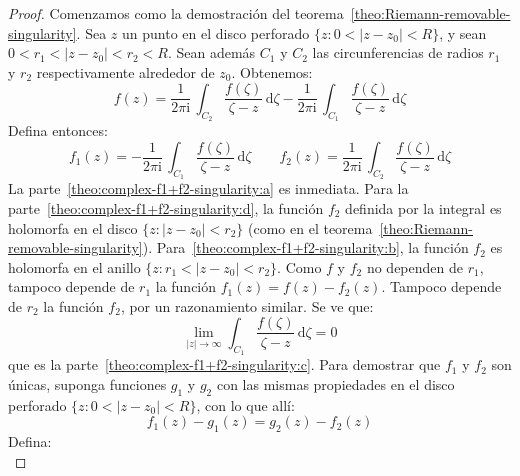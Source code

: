   \begin{proof}
    Comenzamos como la demostración
    del teorema~\ref{theo:Riemann-removable-singularity}.
    Sea \(z\) un punto en el disco perforado
    \(\{ z \colon 0 < \lvert z - z_0 \rvert < R \}\),
    y sean \(0 < r_1 < \lvert z - z_0 \rvert < r_2 < R\).
    Sean además \(C_1\) y \(C_2\)
    las circunferencias
    de radios \(r_1\) y \(r_2\) respectivamente
    alrededor de \(z_0\).
    Obtenemos:
    \begin{equation*}
      f(z)
	= \frac{1}{2 \pi \mathrm{i}} \,
	    \int_{C_2} \frac{f(\zeta)}{\zeta - z}
	      \, \mathrm{d} \zeta
	      - \frac{1}{2 \pi \mathrm{i}} \,
		  \int_{C_1} \frac{f(\zeta)}{\zeta - z}
		    \, \mathrm{d} \zeta
    \end{equation*}
    Defina entonces:
    \begin{equation*}
      f_1(z)
	= - \frac{1}{2 \pi \mathrm{i}} \,
	      \int_{C_1} \frac{f(\zeta)}{\zeta - z}
		\, \mathrm{d} \zeta
     \qquad
      f_2(z)
	= \frac{1}{2 \pi \mathrm{i}} \,
	    \int_{C_2} \frac{f(\zeta)}{\zeta - z}
	      \, \mathrm{d} \zeta
    \end{equation*}
    La parte~\ref{theo:complex-f1+f2-singularity:a} es inmediata.
    Para la parte~\ref{theo:complex-f1+f2-singularity:d},
    la función \(f_2\) definida por la integral es holomorfa
    en el disco \(\{ z \colon \lvert z - z_0 \rvert < r_2 \}\)
    (como en el teorema~\ref{theo:Riemann-removable-singularity}).
    Para~\ref{theo:complex-f1+f2-singularity:b},
    la función \(f_2\) es holomorfa en el anillo
    \(\{ z \colon r_1 < \lvert z - z_0 \rvert < r_2 \}\).
    Como \(f\) y \(f_2\) no dependen de \(r_1\),
    tampoco depende de \(r_1\)
    la función \(f_1(z) = f(z) - f_2(z)\).
    Tampoco depende de \(r_2\) la función \(f_2\),
    por un razonamiento similar.
    Se ve que:
    \begin{equation*}
      \lim_{\lvert z \rvert \rightarrow \infty}
	\int_{C_1} \frac{f(\zeta)}{\zeta - z} \, \mathrm{d} \zeta
	= 0
    \end{equation*}
    que es la parte~\ref{theo:complex-f1+f2-singularity:c}.
    Para demostrar que \(f_1\) y \(f_2\) son únicas,
    suponga funciones \(g_1\) y \(g_2\) con las mismas propiedades
    en el disco perforado
      \(\{ z \colon 0 < \lvert z - z_0 \rvert < R \}\),
    con lo que allí:
    \begin{equation*}
      f_1(z) - g_1(z)
	= g_2(z) - f_2(z)
    \end{equation*}
    Defina:
    \begin{equation*}

\end{equation*}
\end{proof}
